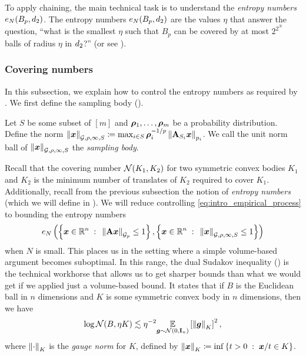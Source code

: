 \documentclass[11pt]{article}
\numberwithin{equation}{section}
\begin{document}
To apply chaining, the main technical task is to understand the \textit{entropy numbers} $e_N(B_{p},d_2)$. The entropy numbers $e_N(B_p, d_2)$ are the values $\eta$ that answer the question, ``what is the smallest $\eta$ such that $B_p$ can be covered by at most $2^{2^N}$ balls of radius $\eta$ in $d_2$?'' (or see ).

\subsubsection{Covering numbers}
\label{sec:overview_geometry}

In this subsection, we explain how to control the entropy numbers as required by . We first define the sampling body ().

\begin{definition}
\label{defn:sampling_polyhedron}
Let $S$ be some subset of $[m]$ and $\bm{\rho}_1,\dots,\bm{\rho}_m$ be a probability distribution. Define the norm $\left\lVert \bm{x} \right\rVert_{\mathcal{G},\rho,\infty, S} \coloneqq \max_{i \in S} \bm{\rho}_i^{-1/p}\left\lVert \mathbf{A}_{S_i}\bm{x} \right\rVert_{p_i}$. We call the unit norm ball of $\left\lVert \bm{x} \right\rVert_{\mathcal{G},\rho,\infty, S}$ the \textit{sampling body}.
\end{definition}

Recall that the covering number $\mathcal{N}(K_1,K_2)$ for two symmetric convex bodies $K_1$ and $K_2$ is the minimum number of translates of $K_2$ required to cover $K_1$. Additionally, recall from the previous subsection the notion of \textit{entropy numbers} (which we will define in ). We will reduce controlling \eqref{eq:intro_empirical_process} to bounding the entropy numbers
\begin{align*}
    e_N\left(\left\{\bm{x}\in\mathbb{R}^n{\;\; : \;\;}\left\lVert \mathbf{A}\bm{x} \right\rVert_{\mathcal{G}_{p}}\le 1\right\}, \left\{\bm{x}\in\mathbb{R}^n{\;\; : \;\;}\left\lVert \bm{x} \right\rVert_{\mathcal{G},\rho,\infty, S}\le 1\right\}\right)
\end{align*}
when $N$ is small. This places us in the setting where a simple volume-based argument becomes suboptimal. In this range, the dual Sudakov inequality () is the technical workhorse that allows us to get sharper bounds than what we would get if we applied just a volume-based bound. It states that if $B$ is the Euclidean ball in $n$ dimensions and $K$ is some symmetric convex body in $n$ dimensions, then we have
\begin{align*}
    \log\mathcal{N}(B,\eta K) \lesssim \eta^{-2} \underset{\bm{g}\sim\mathcal{N}(0,\mathbf{I}_n)}{\mathbb{E}}\left[\left\lVert \bm{g} \right\rVert_K\right]^2,
\end{align*}
where $\left\lVert \cdot \right\rVert_K$ is the \textit{gauge norm} for $K$, defined by $\left\lVert \bm{x} \right\rVert_K \coloneqq \inf\left\{t > 0 {\;\; : \;\;} \bm{x}/t \in K\right\}$.
\end{document}
